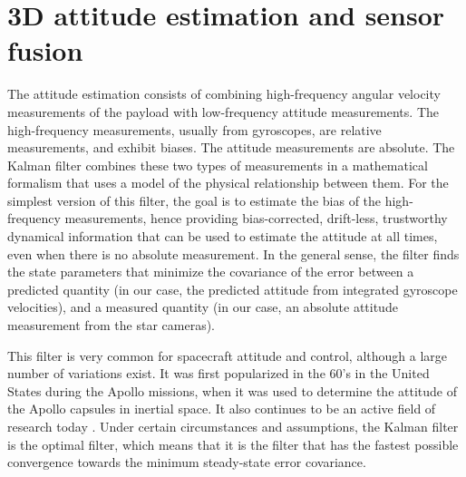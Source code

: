 \section{3D attitude estimation and sensor fusion}
\label{sec:KalmanFilter}
\renewcommand*{\arraystretch}{0.75}


The attitude estimation consists of combining high-frequency angular velocity measurements of the payload with low-frequency attitude measurements. The high-frequency measurements, usually from gyroscopes, are relative measurements, and exhibit biases. The attitude measurements are absolute. The Kalman filter \citep{Kalman:1960ii} combines these two types of measurements in a mathematical formalism that uses a model of the physical relationship between them. For the simplest version of this filter, the goal is to estimate the bias of the high-frequency measurements, hence providing bias-corrected, drift-less, trustworthy dynamical information that can be used to estimate the attitude at all times, even when there is no absolute measurement. In the general sense, the filter finds the state parameters that minimize the covariance of the error between a predicted quantity (in our case, the predicted attitude from integrated gyroscope velocities), and a measured quantity (in our case, an absolute attitude measurement from the star cameras). 


This filter is very common for spacecraft attitude and control, although a large number of variations exist. It was first popularized in the 60's in the United States during the Apollo missions, when it was used to determine the attitude of the Apollo capsules in inertial space. It also continues to be an active field of research today \citep[e.g.,][]{Crassidis:2011ud,Markley:2014dn}. Under certain circumstances and assumptions, the Kalman filter is the optimal filter, which means that it is the filter that has the fastest possible convergence towards the minimum steady-state error covariance.


